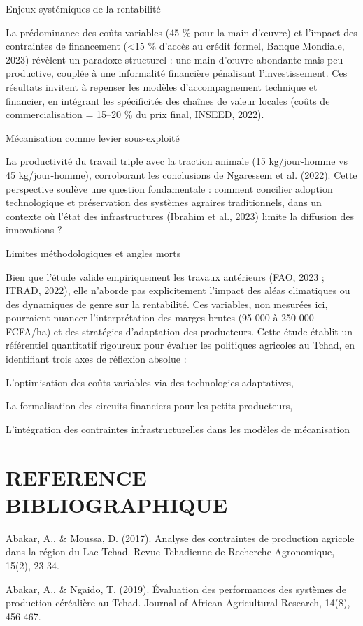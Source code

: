 \documentclass[12pt,oneside]{report}
\begin{document}
Enjeux systémiques de la rentabilité

La prédominance des coûts variables (45 \% pour la main-d’œuvre) et l’impact des contraintes de financement (<15 \% d’accès au crédit formel, Banque Mondiale, 2023) révèlent un paradoxe structurel : une main-d’œuvre abondante mais peu productive, couplée à une informalité financière pénalisant l’investissement. Ces résultats invitent à repenser les modèles d’accompagnement technique et financier, en intégrant les spécificités des chaînes de valeur locales (coûts de commercialisation = 15–20 \% du prix final, INSEED, 2022).

Mécanisation comme levier sous-exploité

La productivité du travail triple avec la traction animale (15 kg/jour-homme vs 45 kg/jour-homme), corroborant les conclusions de Ngaressem et al. (2022). Cette perspective soulève une question fondamentale : comment concilier adoption technologique et préservation des systèmes agraires traditionnels, dans un contexte où l’état des infrastructures (Ibrahim et al., 2023) limite la diffusion des innovations ?

Limites méthodologiques et angles morts

Bien que l’étude valide empiriquement les travaux antérieurs (FAO, 2023 ; ITRAD, 2022), elle n’aborde pas explicitement l’impact des aléas climatiques ou des dynamiques de genre sur la rentabilité. Ces variables, non mesurées ici, pourraient nuancer l’interprétation des marges brutes (95 000 à 250 000 FCFA/ha) et des stratégies d’adaptation des producteurs. Cette étude établit un référentiel quantitatif rigoureux pour évaluer les politiques agricoles au Tchad, en identifiant trois axes de réflexion absolue :

L’optimisation des coûts variables via des technologies adaptatives,

La formalisation des circuits financiers pour les petits producteurs,

L’intégration des contraintes infrastructurelles dans les modèles de mécanisation

\chapter{REFERENCE BIBLIOGRAPHIQUE}
Abakar, A., \& Moussa, D. (2017). Analyse des contraintes de production agricole dans la région du Lac Tchad. Revue Tchadienne de Recherche Agronomique, 15(2), 23-34.

Abakar, A., \& Ngaido, T. (2019). Évaluation des performances des systèmes de production céréalière au Tchad. Journal of African Agricultural Research, 14(8), 456-467.
\end{document}
